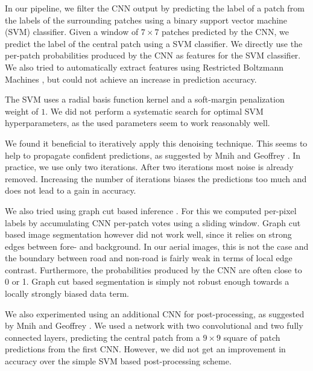 \documentclass[10pt,conference,compsocconf]{IEEEtran}
\begin{document}
\par 
In our pipeline, we filter the CNN output by predicting the label of a patch from the labels of the surrounding patches using a binary support vector machine (SVM) classifier. Given a window of $ 7 \times 7 $ patches predicted by the CNN, we predict the label of the central patch using a SVM classifier. We directly use the per-patch probabilities produced by the CNN as features for the SVM classifier. We also tried to automatically extract features using Restricted Boltzmann Machines \cite{smolensky.1986}, but could not achieve an increase in prediction accuracy.
\par
The SVM uses a radial basis function kernel and a soft-margin penalization weight of $ 1 $. We did not perform a systematic search for optimal SVM hyperparameters, as the used parameters seem to work reasonably well.
\par 
We found it beneficial to iteratively apply this denoising technique. This seems to help to propagate confident predictions, as suggested by Mnih and Geoffrey \cite{Mnih.2010}. In practice, we use only two iterations. After two iterations most noise is already removed. Increasing the number of iterations biases the predictions too much and does not lead to a gain in accuracy.

\par
We also tried using graph cut based inference \cite{Boykov.2001}. For this we computed per-pixel labels by accumulating CNN per-patch votes using a sliding window. Graph cut based image segmentation however did not work well, since it relies on strong edges between fore- and background. In our aerial images, this is not the case and the boundary between road and non-road is fairly weak in terms of local edge contrast. Furthermore, the probabilities produced by the CNN are often close to 0 or 1. Graph cut based segmentation is simply not robust enough towards a locally strongly biased data term.

\par 
We also experimented using an additional CNN for post-processing, as suggested by Mnih and Geoffrey \cite{Mnih.2010}. We used a network with two convolutional and two fully connected layers, predicting the central patch from a $ 9 \times 9 $ square of patch predictions from the first CNN. However, we did not get an improvement in accuracy over the simple SVM based post-processing scheme.
\end{document}

